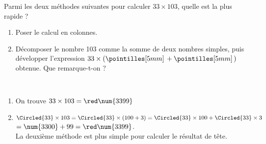\begin{exercice*} %
   Parmi les deux méthodes suivantes pour calculer $33\times103$, quelle est la plus rapide ?
   \begin{enumerate}
      \item Poser le calcul en colonnes.
      \item Décomposer le nombre 103 comme la somme de deux nombres simples, puis développer l'expression $33\times(\pointilles[5mm]\,+ \pointilles[5mm]\,)$ obtenue. Que remarque-t-on ?
   \end{enumerate}
\end{exercice*}

\begin{corrige}
   \ \\ [-5mm]
   \begin{enumerate}
      \item On trouve $33\times103 =\red \num{3399}$
      \item $\Circled{33}\times103 =\Circled{33}\times(100+3) =\Circled{33}\times100+\Circled{33}\times3$ \\
         \hspace*{18mm} $=\num{3300}+99 =\red\num{3399}$. \\
{\red La deuxième méthode est plus simple pour calculer le résultat de tête}.
   \end{enumerate}
\end{corrige}
